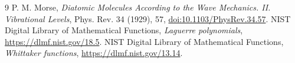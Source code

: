 \documentclass[10pt]{article}
\begin{document}
\begin{thebibliography}{9}
P. M. Morse, \emph{Diatomic Molecules According to the Wave Mechanics. II.
Vibrational Levels}, Phys. Rev. 34 (1929), 57,
\href{https://doi.org/10.1103/PhysRev.34.57}{doi:10.1103/PhysRev.34.57}.
NIST Digital Library of Mathematical Functions, \emph{Laguerre
polynomials}, \url{https://dlmf.nist.gov/18.5}.
NIST Digital Library of Mathematical Functions, \emph{Whittaker
functions}, \url{https://dlmf.nist.gov/13.14}.
\end{thebibliography}
\end{document}
